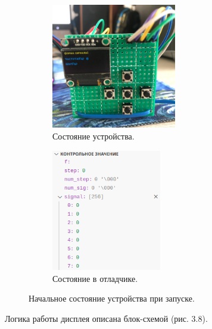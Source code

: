 	\begin{figure}[H]\captionsetup[subfigure]{font=normalsize}
     \begin{subfigure}[H]{0.5\textwidth}
         \centering
         \includegraphics[width=0.6\textwidth]{../image/test0_u_s.jpg}
         \caption{Состояние устройства.}
     \end{subfigure}
     \hfill
     \begin{subfigure}[H]{0.5\textwidth}
         \centering
         \includegraphics[width=0.525\textwidth]{../image/test0_o_s.png}
         \caption{Состояние в отладчике.}
     \end{subfigure}
        \caption{Начальное состояние устройства при запуске.}
	\end{figure}
	
	Логика работы дисплея описана блок-схемой (рис. 3.8).
	
